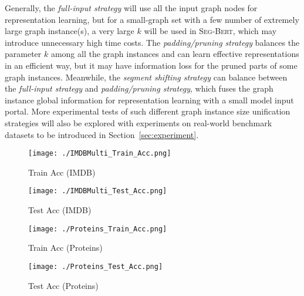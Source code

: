 \documentclass{article}
\newcommand{\our}{\textsc{Seg-Bert}}
\begin{document}
Generally, the \textit{full-input strategy} will use all the input graph nodes for representation learning, but for a small-graph set with a few number of extremely large graph instance(s), a very large $k$ will be used in {\our}, which may introduce unnecessary high time costs. The \textit{padding/pruning strategy} balances the parameter $k$ among all the graph instances and can learn effective representations in an efficient way, but it may have information loss for the pruned parts of some graph instances. Meanwhile, the \textit{segment shifting strategy} can balance between the \textit{full-input strategy} and \textit{padding/pruning strategy}, which fuses the graph instance global information for representation learning with a small model input portal. More experimental tests of such different graph instance size unification strategies will also be explored with experiments on real-world benchmark datasets to be introduced in Section~\ref{sec:experiment}.







\begin{figure*}
    \centering
    \begin{subfigure}[b]{.23\textwidth}
    	\texttt{[image: ./IMDBMulti\_Train\_Acc.png]}
    	\caption{Train Acc (IMDB)}\label{fig:acc_train}
    \end{subfigure}\hfill
    \begin{subfigure}[b]{.23\textwidth}
    	\texttt{[image: ./IMDBMulti\_Test\_Acc.png]}
    	\caption{Test Acc (IMDB)}\label{fig:acc_test}
    \end{subfigure}\hfill
    \begin{subfigure}[b]{.23\textwidth}
    	\texttt{[image: ./Proteins\_Train\_Acc.png]}
    	\caption{Train Acc (Proteins)}\label{fig:acc_train}
    \end{subfigure}\hfill
    \begin{subfigure}[b]{.23\textwidth}
    	\texttt{[image: ./Proteins\_Test\_Acc.png]}
    	\caption{Test Acc (Proteins)}\label{fig:acc_test}
    \end{subfigure}\vspace{-5pt}
    \caption{Learning records of {\our} on the IMDB-Multi social-graph dataset and the Proteins bio-graph dataset. For the graph data with discrete structures, most of the comparison models studied in the experiments will overfit the training data easily and an early stop is usually necessary. The x axis: iteration, and the y axis: training/testing loss.}\label{fig:graph_bert_protein}
    \vspace{-10pt}
\end{figure*}
\end{document}
